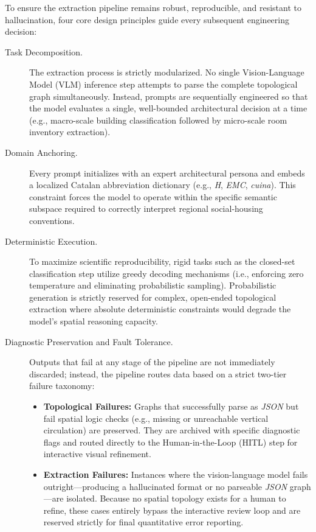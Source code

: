 \documentclass[12pt,a4paper,openright]{report}
\begin{document}
To ensure the extraction pipeline remains robust, reproducible, and resistant to hallucination, four core design principles guide every subsequent engineering decision:

\begin{description}
    \item[Task Decomposition.] The extraction process is strictly modularized. No single Vision-Language Model (VLM) inference step attempts to parse the complete topological graph simultaneously. Instead, prompts are sequentially engineered so that the model evaluates a single, well-bounded architectural decision at a time (e.g., macro-scale building classification followed by micro-scale room inventory extraction).
    
    \item[Domain Anchoring.] Every prompt initializes with an expert architectural persona and embeds a localized Catalan abbreviation dictionary (e.g., \textit{H}, \textit{EMC}, \textit{cuina}). This constraint forces the model to operate within the specific semantic subspace required to correctly interpret regional social-housing conventions.
    
    \item[Deterministic Execution.] To maximize scientific reproducibility, rigid tasks such as the closed-set classification step utilize greedy decoding mechanisms (i.e., enforcing zero temperature and eliminating probabilistic sampling). Probabilistic generation is strictly reserved for complex, open-ended topological extraction where absolute deterministic constraints would degrade the model's spatial reasoning capacity.
    
    \item[Diagnostic Preservation and Fault Tolerance.] Outputs that fail at any stage of the pipeline are not immediately discarded; instead, the pipeline routes data based on a strict two-tier failure taxonomy:
    \begin{itemize}
        \item \textbf{Topological Failures:} Graphs that successfully parse as \textit{JSON} but fail spatial logic checks (e.g., missing or unreachable vertical circulation) are preserved. They are archived with specific diagnostic flags and routed directly to the Human-in-the-Loop (HITL) step for interactive visual refinement.
        \item \textbf{Extraction Failures:} Instances where the vision-language model fails outright---producing a hallucinated format or no parseable \textit{JSON} graph---are isolated. Because no spatial topology exists for a human to refine, these cases entirely bypass the interactive review loop and are reserved strictly for final quantitative error reporting.
    \end{itemize}

\end{description}
\end{document}
